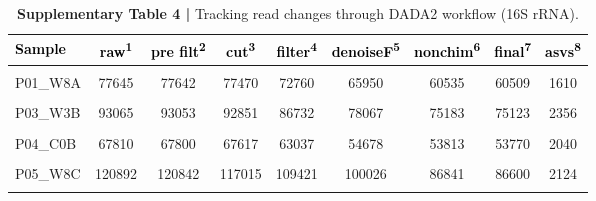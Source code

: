 \documentclass[
  10pt,
  letterpaper,
  DIV=11,
  numbers=noendperiod]{scrartcl}
\begin{document}
\begin{table}[H]

\caption{\textbf{Supplementary Table 4 |} Tracking read changes through DADA2 workflow (16S rRNA).}
\centering
\fontsize{8}{10}\selectfont
\begin{threeparttable}
\begin{tabular}[t]{lcccccccc}
\toprule
\textcolor{black}{\textbf{Sample}} & \textcolor{black}{\textbf{raw\textsuperscript{1}}} & \textcolor{black}{\textbf{pre filt\textsuperscript{2}}} & \textcolor{black}{\textbf{cut\textsuperscript{3}}} & \textcolor{black}{\textbf{filter\textsuperscript{4}}} & \textcolor{black}{\textbf{denoiseF\textsuperscript{5}}} & \textcolor{black}{\textbf{nonchim\textsuperscript{6}}} & \textcolor{black}{\textbf{final\textsuperscript{7}}} & \textcolor{black}{\textbf{asvs\textsuperscript{8}}}\\
\midrule
\cellcolor{gray!6}{P01\_W3A} & \cellcolor{gray!6}{85489} & \cellcolor{gray!6}{85482} & \cellcolor{gray!6}{85402} & \cellcolor{gray!6}{79804} & \cellcolor{gray!6}{70434} & \cellcolor{gray!6}{68037} & \cellcolor{gray!6}{67902} & \cellcolor{gray!6}{2371}\\
P01\_W8A & 77645 & 77642 & 77470 & 72760 & 65950 & 60535 & 60509 & 1610\\
\cellcolor{gray!6}{P02\_C0A} & \cellcolor{gray!6}{87091} & \cellcolor{gray!6}{87085} & \cellcolor{gray!6}{86878} & \cellcolor{gray!6}{81240} & \cellcolor{gray!6}{71961} & \cellcolor{gray!6}{70436} & \cellcolor{gray!6}{70412} & \cellcolor{gray!6}{2272}\\
\addlinespace
P03\_W3B & 93065 & 93053 & 92851 & 86732 & 78067 & 75183 & 75123 & 2356\\
\cellcolor{gray!6}{P03\_W8B} & \cellcolor{gray!6}{66401} & \cellcolor{gray!6}{66367} & \cellcolor{gray!6}{65498} & \cellcolor{gray!6}{60860} & \cellcolor{gray!6}{54822} & \cellcolor{gray!6}{53437} & \cellcolor{gray!6}{53347} & \cellcolor{gray!6}{1575}\\
P04\_C0B & 67810 & 67800 & 67617 & 63037 & 54678 & 53813 & 53770 & 2040\\
\addlinespace
\cellcolor{gray!6}{P05\_W3C} & \cellcolor{gray!6}{58266} & \cellcolor{gray!6}{58259} & \cellcolor{gray!6}{58006} & \cellcolor{gray!6}{54127} & \cellcolor{gray!6}{47868} & \cellcolor{gray!6}{47070} & \cellcolor{gray!6}{47023} & \cellcolor{gray!6}{1663}\\
P05\_W8C & 120892 & 120842 & 117015 & 109421 & 100026 & 86841 & 86600 & 2124\\
\cellcolor{gray!6}{P06\_C0C} & \cellcolor{gray!6}{101599} & \cellcolor{gray!6}{101592} & \cellcolor{gray!6}{101363} & \cellcolor{gray!6}{94740} & \cellcolor{gray!6}{83190} & \cellcolor{gray!6}{81219} & \cellcolor{gray!6}{81150} & \cellcolor{gray!6}{3065}\\

\end{tabular}
\end{threeparttable}
\end{table}
\end{document}
